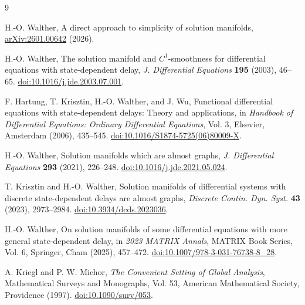 \documentclass[11pt]{article}
\begin{document}
\begin{thebibliography}{9}

H.-O. Walther,
A direct approach to simplicity of solution manifolds,
\href{https://arxiv.org/abs/2601.00642}
{arXiv:2601.00642} (2026).

H.-O. Walther,
The solution manifold and $C^1$-smoothness for
differential equations with state-dependent delay,
\emph{J. Differential Equations}
\textbf{195} (2003), 46--65.
\href{https://doi.org/10.1016/j.jde.2003.07.001}
{doi:10.1016/j.jde.2003.07.001}.

F. Hartung, T. Krisztin, H.-O. Walther, and J. Wu,
Functional differential equations with state-dependent
delays: Theory and applications,
in \emph{Handbook of Differential Equations:
Ordinary Differential Equations}, Vol. 3,
Elsevier, Amsterdam (2006), 435--545.
\href{https://doi.org/10.1016/S1874-5725(06)80009-X}
{doi:10.1016/S1874-5725(06)80009-X}.

H.-O. Walther,
Solution manifolds which are almost graphs,
\emph{J. Differential Equations}
\textbf{293} (2021), 226--248.
\href{https://doi.org/10.1016/j.jde.2021.05.024}
{doi:10.1016/j.jde.2021.05.024}.

T. Krisztin and H.-O. Walther,
Solution manifolds of differential systems with
discrete state-dependent delays are almost graphs,
\emph{Discrete Contin. Dyn. Syst.}
\textbf{43} (2023), 2973--2984.
\href{https://doi.org/10.3934/dcds.2023036}
{doi:10.3934/dcds.2023036}.

H.-O. Walther,
On solution manifolds of some differential equations
with more general state-dependent delay,
in \emph{2023 MATRIX Annals},
MATRIX Book Series, Vol. 6,
Springer, Cham (2025), 457--472.
\href{https://doi.org/10.1007/978-3-031-76738-8_28}
{doi:10.1007/978-3-031-76738-8\_28}.

A. Kriegl and P. W. Michor,
\emph{The Convenient Setting of Global Analysis},
Mathematical Surveys and Monographs, Vol. 53,
American Mathematical Society, Providence (1997).
\href{https://doi.org/10.1090/surv/053}
{doi:10.1090/surv/053}.

\end{thebibliography}
\end{document}
